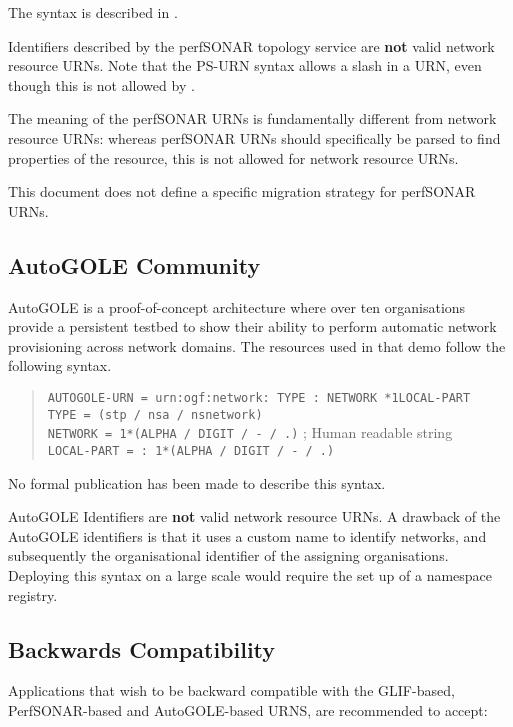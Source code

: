 \documentclass[12pt]{article}  %
\begin{document}
The syntax is described in \cite{ps-urn}.

Identifiers described by the perfSONAR topology service are \textbf{not} valid network resource URNs.
Note that the PS-URN syntax allows a slash in a URN, even though this is not allowed by \cite{rfc2141}.

The meaning of the perfSONAR URNs is fundamentally different from network resource URNs:
whereas perfSONAR URNs should specifically be parsed to find properties of the resource, 
this is not allowed for network resource URNs.

This document does not define a specific migration strategy for perfSONAR URNs.

\subsection{AutoGOLE Community}

AutoGOLE is a proof-of-concept architecture where over ten organisations provide a persistent testbed to show their ability to perform automatic network provisioning across network domains. The resources used in that demo follow the following syntax.

\begin{quote}
  \texttt{AUTOGOLE-URN = \qq{}urn:ogf:network:\qq{} TYPE \qq{}:\qq{} NETWORK *1LOCAL-PART} \\
  \texttt{TYPE = (\qq{}stp\qq{} / \qq{}nsa\qq{} / \qq{}nsnetwork\qq{})} \\
  \texttt{NETWORK = 1*(ALPHA / DIGIT / \qq{}-\qq{} / \qq{}.\qq{})} ; Human readable string \\
  \texttt{LOCAL-PART = \qq{}:\qq{} 1*(ALPHA / DIGIT / \qq{}-\qq{} / \qq{}.\qq{})}
\end{quote}

No formal publication has been made to describe this syntax.

AutoGOLE Identifiers are \textbf{not} valid network resource URNs. A drawback 
of the AutoGOLE identifiers is that it uses a custom name to identify networks, 
and subsequently the organisational identifier of the assigning organisations. 
Deploying this syntax on a large scale would require the set up of a namespace registry.

\subsection{Backwards Compatibility}

Applications that wish to be backward compatible with the GLIF-based, PerfSONAR-based and AutoGOLE-based URNS, are recommended to accept:
\end{document}
